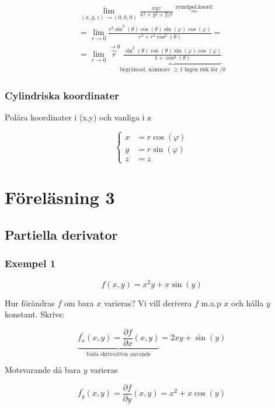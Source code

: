 \documentclass{article}
\begin{document}
\[
\begin{split}
	\lim_{(x,y,z) \rightarrow (0,0,0)} \frac{xyz}{x^2+y^2+2z^2} \overset{\mathrm{rymdpol.koord}}{=} \\
	= \lim_{r \rightarrow 0} \frac{r^3 \sin^2(\theta) \cos(\theta) \sin(\varphi) \cos(\varphi)}{r^2+r^2 \cos^2(\theta)} = \\
	= \lim_{r \rightarrow 0} \overbrace{r}^{\rightarrow 0} \underbrace{\frac{\sin^2(\theta) \cos(\theta) \sin(\varphi) \cos(\varphi)}{1+\cos^2(\theta)}}_\text{begränsad, nämnare \(\geq 1 \) ingen risk för /0}
\end{split}
\]

\subsubsection{Cylindriska koordinater}

Polära koordinater i (x,y) och vanliga i z

\[
\left\{\begin{array}{rcl}
	x & = r \cos(\varphi) \\
	y & = r \sin(\varphi) \\
	z & = z 
\end{array}\right.
\]

\newpage
\section{Föreläsning 3}
\subsection{Partiella derivator}

\subsubsection{Exempel 1}

\begin{equation} \label{eq:3.1}
	f(x,y) = x^2y + x\sin(y)
\end{equation}

Hur förändras \(f\) om bara \(x\) varieras? Vi vill derivera \(f\) m.a.p \(x\) och hålla \(y\) konstant. Skrivs:

\[
	\underbrace{f^{\prime}_{x}(x,y) = \frac{\partial f}{\partial x}(x,y)}_{\text{båda skrivsätten används}} = 2xy+\sin(y)
\]

Motsvarande då bara \(y\) varieras

\[
	f^{\prime}_{y}(x,y) = \frac{\partial f}{\partial y}(x,y) = x^2 + x\cos(y)
\]
\end{document}
